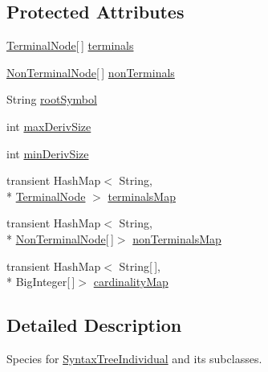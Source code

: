 \subsection*{Protected Attributes}
\begin{DoxyCompactItemize}
\item 
\hyperlink{classnet_1_1sf_1_1jclec_1_1syntaxtree_1_1_terminal_node}{Terminal\-Node}\mbox{[}$\,$\mbox{]} \hyperlink{classnet_1_1sf_1_1jclec_1_1syntaxtree_1_1_syntax_tree_schema_adb1b36c1f168bd3f87dad9e1f40e7c4d}{terminals}
\item 
\hyperlink{classnet_1_1sf_1_1jclec_1_1syntaxtree_1_1_non_terminal_node}{Non\-Terminal\-Node}\mbox{[}$\,$\mbox{]} \hyperlink{classnet_1_1sf_1_1jclec_1_1syntaxtree_1_1_syntax_tree_schema_a9029c7ded48bc795194faff53e13c2b2}{non\-Terminals}
\item 
String \hyperlink{classnet_1_1sf_1_1jclec_1_1syntaxtree_1_1_syntax_tree_schema_aab4ff6d931566275df40f10f0a38f3ba}{root\-Symbol}
\item 
int \hyperlink{classnet_1_1sf_1_1jclec_1_1syntaxtree_1_1_syntax_tree_schema_a6f8c08c9aac2df7a5e3423cad6a25f4f}{max\-Deriv\-Size}
\item 
int \hyperlink{classnet_1_1sf_1_1jclec_1_1syntaxtree_1_1_syntax_tree_schema_a5b010a5e719ed52b695b78e5eb192b8e}{min\-Deriv\-Size}
\item 
transient Hash\-Map$<$ String, \\*
\hyperlink{classnet_1_1sf_1_1jclec_1_1syntaxtree_1_1_terminal_node}{Terminal\-Node} $>$ \hyperlink{classnet_1_1sf_1_1jclec_1_1syntaxtree_1_1_syntax_tree_schema_ad9f1b6f7d3e7f077d1c136989e2da3ac}{terminals\-Map}
\item 
transient Hash\-Map$<$ String, \\*
\hyperlink{classnet_1_1sf_1_1jclec_1_1syntaxtree_1_1_non_terminal_node}{Non\-Terminal\-Node}\mbox{[}$\,$\mbox{]}$>$ \hyperlink{classnet_1_1sf_1_1jclec_1_1syntaxtree_1_1_syntax_tree_schema_ace57376f44005ecb8a2dbd7cb8a823d7}{non\-Terminals\-Map}
\item 
transient Hash\-Map$<$ String\mbox{[}$\,$\mbox{]}, \\*
Big\-Integer\mbox{[}$\,$\mbox{]}$>$ \hyperlink{classnet_1_1sf_1_1jclec_1_1syntaxtree_1_1_syntax_tree_schema_ae812657259cf847264666e5b6fa61577}{cardinality\-Map}
\end{DoxyCompactItemize}


\subsection{Detailed Description}
Species for \hyperlink{classnet_1_1sf_1_1jclec_1_1syntaxtree_1_1_syntax_tree_individual}{Syntax\-Tree\-Individual} and its subclasses.

